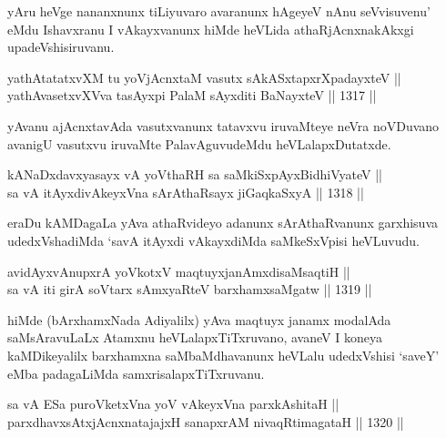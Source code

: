 \begin{artha}
yAru heVge  nananxnunx tiLiyuvaro avaranunx hAgeyeV nAnu seVvisuvenu' eMdu Ishavxranu I vAkayxvanunx hiMde heVLida athaRjAcnxnakAkxgi upadeVshisiruvanu.
\end{artha}

\begin{shl}
yathAtatatxvXM tu yoV\s jAcnxtaM vasutx sAkASxtapxrXpadayxteV ||  \\
yathAvasetxvXVva tasAyxpi PalaM  sAyxditi BaNayxteV \hfill || 1317 ||  
\end{shl}

\begin{artha}
yAvanu ajAcnxtavAda vasutxvanunx tatavxvu iruvaMteye neVra noVDuvano avanigU vasutxvu iruvaMte PalavAguvudeMdu heVLalapxDutatxde.
\end{artha}


\begin{shl}
kANaDxdavxyasayx vA yoV\s thaRH sa saMkiSxpAyxBidhiVyateV || \\
sa vA itAyxdivAkeyxVna sArAthaRsayx jiGaqkaSxyA \hfill || 1318 ||  
\end{shl}

\begin{artha}
eraDu kAMDagaLa yAva athaRvideyo adanunx sArAthaRvanunx garxhisuva udedxVshadiMda `savA itAyxdi vAkayxdiMda saMkeSxVpisi heVLuvudu.
\end{artha}


\begin{shl}
avidAyxvAnupxrA yoVkotxV maqtuyxjanAmxdisaMsaqtiH || \\
sa vA iti girA soV\s tarx sAmxyaRteV barxhamxsaMgatw \hfill || 1319 ||  
\end{shl}

\begin{artha}
hiMde (bArxhamxNada Adiyalilx) yAva maqtuyx janamx modalAda saMsAravuLaLx Atamxnu heVLalapxTiTxruvano, avaneV I koneya kaMDikeyalilx barxhamxna saMbaMdhavanunx heVLalu udedxVshisi `saveY' eMba padagaLiMda samxrisalapxTiTxruvanu.
\end{artha}


\begin{shl}
sa vA ESa puroVketxVna yoV vAkeyxVna parxkAshitaH || \\
parxdhavxsAtxjAcnxnatajajxH sanapxrAM nivaqRtimagataH \hfill || 1320 ||  
\end{shl}


